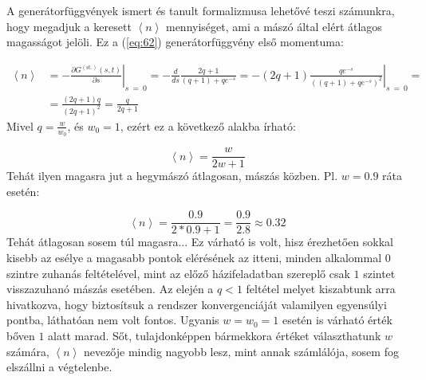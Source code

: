 A generátorfüggvények ismert és tanult formalizmusa lehetővé teszi számunkra, hogy megadjuk a keresett $\left< n \right>$ mennyiséget, ami a mászó által elért átlagos magasságot jelöli. Ez a (\ref{eq:62}) generátorfüggvény első momentuma:

\begin{align}
    \left< n \right>
    &=
    - \left. \frac{\partial G^{\left( \text{st.} \right)} \left( s,t \right)}{\partial s} \right\rvert_{s\ =\ 0}
    =
    - \frac{d}{d s} \frac{2q + 1}{\left( q + 1 \right) + q e^{-s}}
    =
    - \left. \left( 2q + 1 \right) \frac{q e^{-s}}{\left( \left( q + 1 \right) + q e^{-s} \right)^{2}} \right\rvert_{s\ =\ 0}
    = \nonumber \\
    &=
    \frac{\left( 2q + 1 \right) q}{\left( 2q + 1 \right)^{2}}
    =
    \frac{q}{2q + 1}
\end{align}
Mivel $q = \frac{w}{w_{0}}$, és $w_{0} = 1$, ezért ez a következő alakba írható:

\begin{equation}
    \boxed{
    \left< n \right>
    =
    \frac{w}{2w + 1}
    }
\end{equation}
Tehát ilyen magasra jut a hegymászó átlagosan, mászás közben. Pl. $w = 0.9$ ráta esetén:

\begin{equation}
    \left< n \right>
    =
    \frac{0.9}{2 * 0.9 + 1}
    =
    \frac{0.9}{2.8}
    \approx
    0.32
\end{equation}
Tehát átlagosan sosem túl magasra... Ez várható is volt, hisz érezhetően sokkal kisebb az esélye a magasabb pontok elérésének az itteni, minden alkalommal $0$ szintre zuhanás feltételével, mint az előző házifeladatban szereplő csak $1$ szintet visszazuhanó mászás esetében. Az elején a $q < 1$ feltétel melyet kiszabtunk arra hivatkozva, hogy biztosítsuk a rendszer konvergenciáját valamilyen egyensúlyi pontba, láthatóan nem volt fontos. Ugyanis $w = w_{0} = 1$ esetén is várható érték bőven $1$ alatt marad. Sőt, tulajdonképpen bármekkora értéket választhatunk $w$ számára, $\left< n \right>$ nevezője mindig nagyobb lesz, mint annak számlálója, sosem fog elszállni a végtelenbe.